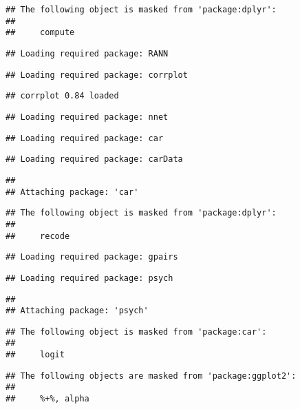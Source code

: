 \documentclass[
]{article}
\begin{document}
\begin{verbatim}
## The following object is masked from 'package:dplyr':
## 
##     compute
\end{verbatim}

\begin{verbatim}
## Loading required package: RANN
\end{verbatim}

\begin{verbatim}
## Loading required package: corrplot
\end{verbatim}

\begin{verbatim}
## corrplot 0.84 loaded
\end{verbatim}

\begin{verbatim}
## Loading required package: nnet
\end{verbatim}

\begin{verbatim}
## Loading required package: car
\end{verbatim}

\begin{verbatim}
## Loading required package: carData
\end{verbatim}

\begin{verbatim}
## 
## Attaching package: 'car'
\end{verbatim}

\begin{verbatim}
## The following object is masked from 'package:dplyr':
## 
##     recode
\end{verbatim}

\begin{verbatim}
## Loading required package: gpairs
\end{verbatim}

\begin{verbatim}
## Loading required package: psych
\end{verbatim}

\begin{verbatim}
## 
## Attaching package: 'psych'
\end{verbatim}

\begin{verbatim}
## The following object is masked from 'package:car':
## 
##     logit
\end{verbatim}

\begin{verbatim}
## The following objects are masked from 'package:ggplot2':
## 
##     %+%, alpha
\end{verbatim}
\end{document}
